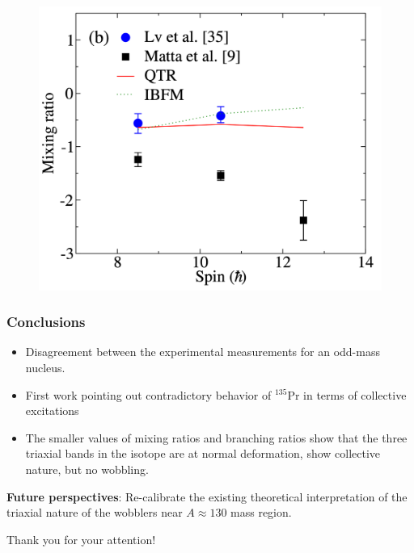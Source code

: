 \documentclass{beamer}
\begin{document}
\begin{frame}
\begin{figure}
		\includegraphics[scale=0.13]{figures/new-DATA-3.pdf}
	\end{figure}
\end{frame}

\begin{frame}
	\frametitle{Conclusions}

	\begin{itemize}
		\item Disagreement between the experimental measurements for an odd-mass nucleus.
		\item First work pointing out contradictory behavior of $^{135}$Pr in terms of collective excitations
		\item The smaller values of mixing ratios and branching ratios show that the three triaxial bands in the isotope are at normal deformation, show collective nature, but no wobbling.
	\end{itemize}
	\textbf{Future perspectives}: Re-calibrate the existing theoretical interpretation of the triaxial nature of the wobblers near $A\approx 130$ mass region.
	

\end{frame}

\begin{frame}
	\begin{center}
		\bigskip\bigskip
		{\Huge Thank you for your attention!}
	\end{center}
\end{frame} 
\end{document}
